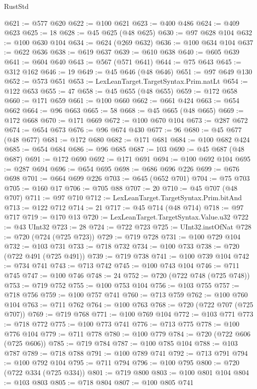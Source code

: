 \begin{lexlean}{RustStd}
\begin{coremodule}
@621 := @577 @620
@622 := @100 @621
@623 := @400 @486
@624 := @409 @623
@625 := 18
@628 := @45 @625 (@48 @625)
@630 := @97 @628 @104
@632 := @100 @630 @104
@634 := @624 (@269 @632)
@636 := @100 @634 @104
@637 := @622 @636
@638 := @619 @637
@639 := @610 @638
@640 := @605 @639
@641 := @604 @640
@643 := @567 (@571 @641)
@644 := @75 @643
@645 := @312 @162
@646 := 19
@649 := @45 @646 (@48 @646)
@651 := @97 @649 @130
@652 := @573 @651
@653 := LexLeanTarget.TargetSyntax.Prim.natLt
@654 := @122 @653
@655 := 47
@658 := @45 @655 (@48 @655)
@659 := @172 @658
@660 := @171 @659
@661 := @100 @660
@662 := @661 @424
@663 := @654 @662
@664 := @96 @663
@665 := 58
@668 := @45 @665 (@48 @665)
@669 := @172 @668
@670 := @171 @669
@672 := @100 @670 @104
@673 := @287 @672
@674 := @654 @673
@676 := @96 @674 @430
@677 := 96
@680 := @45 @677 (@48 @677)
@681 := @172 @680
@682 := @171 @681
@684 := @100 @682 @424
@685 := @654 @684
@686 := @96 @685
@687 := 103
@690 := @45 @687 (@48 @687)
@691 := @172 @690
@692 := @171 @691
@694 := @100 @692 @104
@695 := @287 @694
@696 := @654 @695
@698 := @686 @696 @226
@699 := @676 @698
@701 := @664 @699 @226
@703 := @645 (@652 @701)
@704 := @75 @703
@705 := @160 @17
@706 := @705 @88
@707 := 20
@710 := @45 @707 (@48 @707)
@711 := @97 @710
@712 := LexLeanTarget.TargetSyntax.Prim.bitAnd
@713 := @122 @712
@714 := 21
@717 := @45 @714 (@48 @714)
@718 := @97 @717
@719 := @170 @13
@720 := LexLeanTarget.TargetSyntax.Value.u32
@722 := @43 UInt32
@723 := 28
@724 := @722 @723
@725 := UInt32.instOfNat
@728 := @720 (@724 (@725 @723))
@729 := @719 @728
@731 := @100 @729 @104
@732 := @103 @731
@733 := @718 @732
@734 := @100 @733
@738 := @720 (@722 @491 (@725 @491))
@739 := @719 @738
@741 := @100 @739 @104
@742 := @734 @741
@743 := @713 @742
@745 := @100 @743 @104
@746 := @711 @745
@747 := @100 @746
@748 := 24
@752 := @720 (@722 @748 (@725 @748))
@753 := @719 @752
@755 := @100 @753 @104
@756 := @103 @755
@757 := @718 @756
@759 := @100 @757 @741
@760 := @713 @759
@762 := @100 @760 @104
@763 := @711 @762
@764 := @100 @763
@768 := @720 (@722 @707 (@725 @707))
@769 := @719 @768
@771 := @100 @769 @104
@772 := @103 @771
@773 := @718 @772
@775 := @100 @773 @741
@776 := @713 @775
@778 := @100 @776 @104
@779 := @711 @778
@780 := @100 @779
@784 := @720 (@722 @606 (@725 @606))
@785 := @719 @784
@787 := @100 @785 @104
@788 := @103 @787
@789 := @718 @788
@791 := @100 @789 @741
@792 := @713 @791
@794 := @100 @792 @104
@795 := @711 @794
@796 := @100 @795
@800 := @720 (@722 @334 (@725 @334))
@801 := @719 @800
@803 := @100 @801 @104
@804 := @103 @803
@805 := @718 @804
@807 := @100 @805 @741

\end{coremodule}
\end{lexlean}
